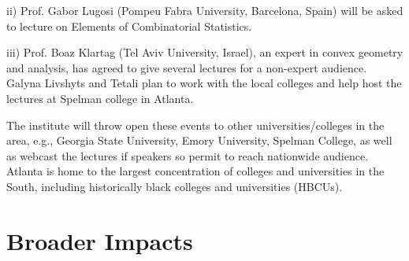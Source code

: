\documentclass[12pt]{article}
\begin{document}
ii) Prof. Gabor Lugosi (Pompeu Fabra University, Barcelona, Spain) will be asked to lecture on Elements of Combinatorial Statistics.

iii) Prof. Boaz Klartag (Tel Aviv University, Israel), an expert in convex geometry and analysis, has agreed to give several lectures for a non-expert audience. Galyna Livshyts and Tetali plan to work with the local colleges and help host the lectures at Spelman college in Atlanta.%

The institute will throw open these events to other universities/colleges in the area, e.g., Georgia State University, Emory University, Spelman College, as well as webcast the lectures
if speakers so permit to reach nationwide audience. Atlanta is home to the largest concentration of colleges and universities in the South, including historically black colleges and universities (HBCUs).


%
%




\vspace*{-1em}

\section{Broader Impacts}
\label{sec:broaderimpact}
\end{document}

